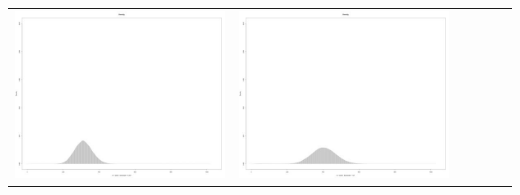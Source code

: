 \begin{table}[htbp]
{\begin{tabular}{l | ccccc}
\begin{minipage}{.15\textwidth}
     			 	\includegraphics[width=\linewidth]{images/mema-dens-graph/N12}
    				 \end{minipage}
    			   &	 \begin{minipage}{.15\textwidth}
     			 	\includegraphics[width=\linewidth]{images/mema-dens-graph/N14}
    				 \end{minipage}
    			   &	 \begin{minipage}{.15\textwidth}

\end{minipage}
\end{tabular}}
\end{table}
